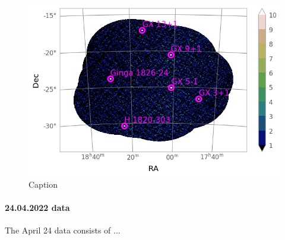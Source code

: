         \begin{figure}[H]
        \centering
        \includegraphics[width = 12cm]{report/Figures/methods/2204/oda_2204.png}
        \caption{Caption}
        \label{22_mosaic}
        \end{figure}
    
    \paragraph{24.04.2022 data}
    The April 24 data consists of ...

